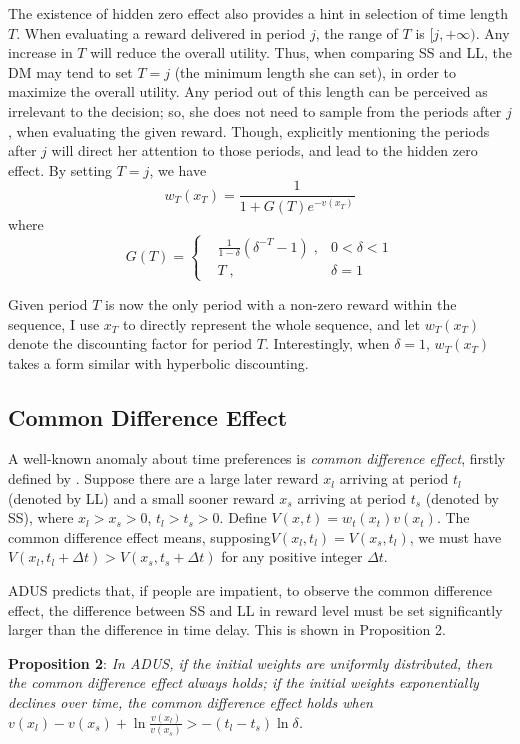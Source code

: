 \documentclass[
  12pt,
]{article}
\begin{document}
The existence of hidden zero effect also provides a hint in selection of
time length \(T\). When evaluating a reward delivered in period \(j\),
the range of \(T\) is \([j,+\infty)\). Any increase in \(T\) will reduce
the overall utility. Thus, when comparing SS and LL, the DM may tend to
set \(T=j\) (the minimum length she can set), in order to maximize the
overall utility. Any period out of this length can be perceived as
irrelevant to the decision; so, she does not need to sample from the
periods after \(j\), when evaluating the given reward. Though,
explicitly mentioning the periods after \(j\) will direct her attention
to those periods, and lead to the hidden zero effect. By setting
\(T=j\), we
have\[ w_T(x_T) = \frac{1}{1+G(T)e^{-v(x_T)}} \]where\[ G(T) = \left\{ \begin{aligned} & \frac{1}{1-\delta}(\delta^{-T}-1) \; ,& 0<\delta<1\\ & T\; ,& \delta=1\ \end{aligned} \right. \]

Given period \(T\) is now the only period with a non-zero reward within
the sequence, I use \(x_T\) to directly represent the whole sequence,
and let \(w_T(x_T)\) denote the discounting factor for period \(T\).
Interestingly, when \(\delta=1\), \(w_T(x_T)\) takes a form similar with
hyperbolic discounting.

\hypertarget{common-difference-effect}{%
\subsection{Common Difference Effect}\label{common-difference-effect}}

A well-known anomaly about time preferences is \emph{common difference
effect}, firstly defined by \citet{loewenstein_anomalies_1992}. Suppose
there are a large later reward \(x_l\) arriving at period \(t_l\)
(denoted by LL) and a small sooner reward \(x_s\) arriving at period
\(t_s\) (denoted by SS), where \(x_l>x_s>0\), \(t_l>t_s>0\). Define
\(V(x,t)=w_t(x_t)v(x_t)\). The common difference effect means,
supposing\(V(x_l,t_l)=V(x_s,t_l)\), we must have
\(V(x_l,t_l+\Delta t)>V(x_s,t_s+\Delta t)\) for any positive integer
\(\Delta t\).

ADUS predicts that, if people are impatient, to observe the common
difference effect, the difference between SS and LL in reward level must
be set significantly larger than the difference in time delay. This is
shown in Proposition 2.

\textbf{Proposition 2}: \emph{In ADUS, if the initial weights are
uniformly distributed, then the common difference effect always holds;
if the initial weights exponentially declines over time, the common
difference effect holds when}
\(v(x_l)-v(x_s)+\ln\frac{v(x_l)}{v(x_s)}>-(t_l-t_s)\ln\delta\)\emph{.}
\end{document}
